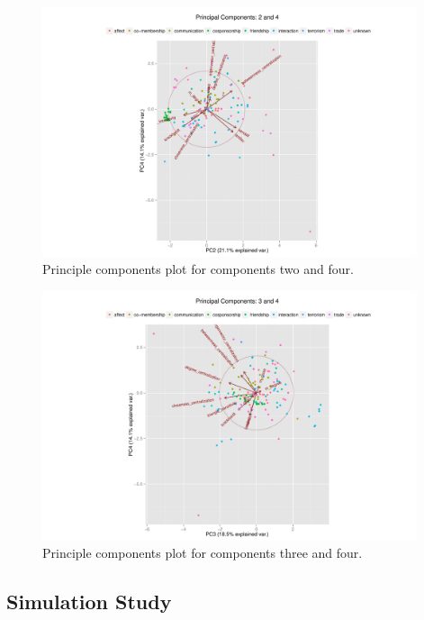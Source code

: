 \documentclass[3p,times]{elsarticle}
\begin{document}
\begin{figure}
\begin{center}
	\caption{\label{fig:2 and 4} Principle components plot for components two and four.}
		\includegraphics[width = 0.98\textwidth]{./images/Observed_PCA_Components2_4.pdf}
\end{center}
\end{figure}

\begin{figure}
\begin{center}
	\caption{\label{fig:3 and 4} Principle components plot for components three and four.}
		\includegraphics[width = 0.98\textwidth]{./images/Observed_PCA_Components3_4.pdf}
\end{center}
\end{figure}


\subsection{Simulation Study}
\label{sec:simulated figures}
\end{document}
